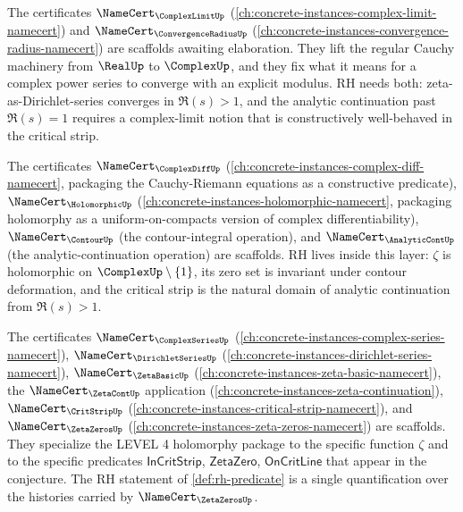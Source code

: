 \begin{remark}
\label{rem:rh-level-3}
The certificates $\NameCert_{\ComplexLimitUp}$ (\autoref{ch:concrete-instances-complex-limit-namecert}) and $\NameCert_{\ConvergenceRadiusUp}$ (\autoref{ch:concrete-instances-convergence-radius-namecert}) are scaffolds awaiting elaboration. They lift the regular Cauchy machinery from $\RealUp$ to $\ComplexUp$, and they fix what it means for a complex power series to converge with an explicit modulus. RH needs both: zeta-as-Dirichlet-series converges in $\Re(s) > 1$, and the analytic continuation past $\Re(s) = 1$ requires a complex-limit notion that is constructively well-behaved in the critical strip.
\end{remark}

\begin{remark}
\label{rem:rh-level-4}
The certificates $\NameCert_{\ComplexDiffUp}$ (\autoref{ch:concrete-instances-complex-diff-namecert}, packaging the Cauchy-Riemann equations as a constructive predicate), $\NameCert_{\HolomorphicUp}$ (\autoref{ch:concrete-instances-holomorphic-namecert}, packaging holomorphy as a uniform-on-compacts version of complex differentiability), $\NameCert_{\ContourUp}$ (the contour-integral operation), and $\NameCert_{\AnalyticContUp}$ (the analytic-continuation operation) are scaffolds. RH lives inside this layer: $\zeta$ is holomorphic on $\ComplexUp \setminus \{1\}$, its zero set is invariant under contour deformation, and the critical strip is the natural domain of analytic continuation from $\Re(s) > 1$.
\end{remark}

\begin{remark}
\label{rem:rh-level-5}
The certificates $\NameCert_{\ComplexSeriesUp}$ (\autoref{ch:concrete-instances-complex-series-namecert}), $\NameCert_{\DirichletSeriesUp}$ (\autoref{ch:concrete-instances-dirichlet-series-namecert}), $\NameCert_{\ZetaBasicUp}$ (\autoref{ch:concrete-instances-zeta-basic-namecert}), the $\NameCert_{\ZetaContUp}$ application (\autoref{ch:concrete-instances-zeta-continuation}), $\NameCert_{\CritStripUp}$ (\autoref{ch:concrete-instances-critical-strip-namecert}), and $\NameCert_{\ZetaZerosUp}$ (\autoref{ch:concrete-instances-zeta-zeros-namecert}) are scaffolds. They specialize the LEVEL 4 holomorphy package to the specific function $\zeta$ and to the specific predicates $\mathsf{InCritStrip}$, $\mathsf{ZetaZero}$, $\mathsf{OnCritLine}$ that appear in the conjecture. The RH statement of \autoref{def:rh-predicate} is a single quantification over the histories carried by $\NameCert_{\ZetaZerosUp}$.
\end{remark}

